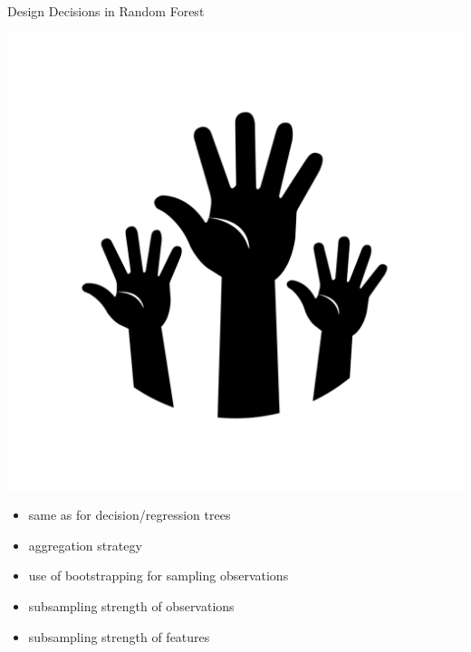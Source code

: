 \begin{frame}[c]{Design Decisions in Random Forest}

\includegraphics[scale=0.05]{images/hands}
\pause

\begin{itemize}
  \item same as for decision/regression trees
  \item aggregation strategy
  \item use of bootstrapping for sampling observations
  \item subsampling strength of observations
  \item subsampling strength of features
\end{itemize}

\end{frame}
